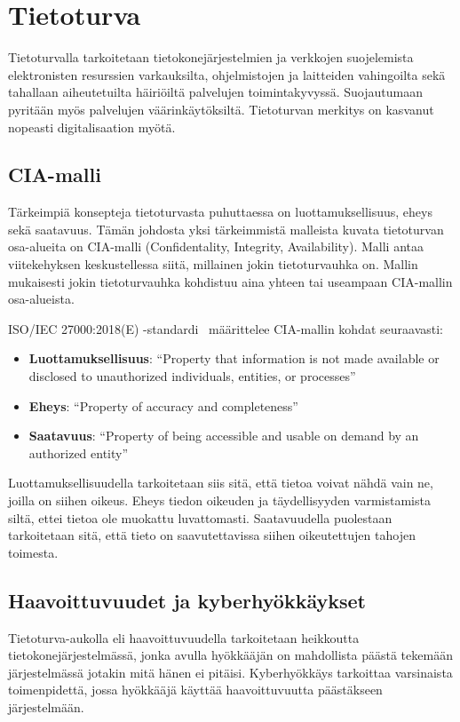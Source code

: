 \chapter{Tietoturva}\label{tietoturva}

Tietoturvalla tarkoitetaan tietokonejärjestelmien ja verkkojen suojelemista elektronisten resurssien varkauksilta, ohjelmistojen ja laitteiden vahingoilta sekä tahallaan aiheutetuilta häiriöiltä palvelujen toimintakyvyssä. Suojautumaan pyritään myös palvelujen väärinkäytöksiltä. Tietoturvan merkitys on kasvanut nopeasti digitalisaation myötä.~\cite{andress2014basics}

\section{CIA-malli}\label{cia_malli}

Tärkeimpiä konsepteja tietoturvasta puhuttaessa on luottamuksellisuus, eheys sekä saatavuus. Tämän johdosta yksi tärkeimmistä malleista kuvata tietoturvan osa-alueita on CIA-malli (Confidentality, Integrity, Availability). Malli antaa viitekehyksen keskustellessa siitä, millainen jokin tietoturvauhka on. Mallin mukaisesti jokin tietoturvauhka kohdistuu aina yhteen tai useampaan CIA-mallin osa-alueista.

ISO/IEC 27000:2018(E) -standardi~\cite{ISO27000} määrittelee CIA-mallin kohdat seuraavasti:

\begin{itemize}
    \item \textbf{Luottamuksellisuus}: ``Property that information is not made available or disclosed to unauthorized individuals, entities, or processes''
    \item \textbf{Eheys}: ``Property of accuracy and completeness''
    \item \textbf{Saatavuus}: ``Property of being accessible and usable on demand by an authorized entity''
\end{itemize}

Luottamuksellisuudella tarkoitetaan siis sitä, että tietoa voivat nähdä vain ne, joilla on siihen oikeus. Eheys tiedon oikeuden ja täydellisyyden varmistamista siltä, ettei tietoa ole muokattu luvattomasti. Saatavuudella puolestaan tarkoitetaan sitä, että tieto on saavutettavissa siihen oikeutettujen tahojen toimesta.~\cite{stamp2011information}

\section{Haavoittuvuudet ja kyberhyökkäykset}\label{haavoittuvuudet_ja_kyberhyokkaykset}
Tietoturva-aukolla eli haavoittuvuudella tarkoitetaan heikkoutta tietokonejärjestelmässä, jonka avulla hyökkääjän on mahdollista päästä tekemään järjestelmässä jotakin mitä hänen ei pitäisi. Kyberhyökkäys tarkoittaa varsinaista toimenpidettä, jossa hyökkääjä käyttää haavoittuvuutta päästäkseen järjestelmään.~\cite{andress2014basics}

